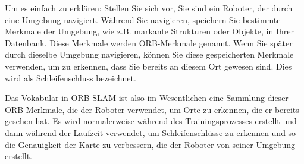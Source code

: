 Um es einfach zu erklären: Stellen Sie sich vor, Sie sind ein Roboter, der durch eine Umgebung navigiert. Während Sie navigieren, speichern Sie bestimmte Merkmale der Umgebung, wie z.B. markante Strukturen oder Objekte, in Ihrer Datenbank. Diese Merkmale werden ORB-Merkmale genannt. Wenn Sie später durch dieselbe Umgebung navigieren, können Sie diese gespeicherten Merkmale verwenden, um zu erkennen, dass Sie bereits an diesem Ort gewesen sind. Dies wird als Schleifenschluss bezeichnet.

Das Vokabular in ORB-SLAM ist also im Wesentlichen eine Sammlung dieser ORB-Merkmale, die der Roboter verwendet, um Orte zu erkennen, die er bereits gesehen hat. Es wird normalerweise während des Trainingsprozesses erstellt und dann während der Laufzeit verwendet, um Schleifenschlüsse zu erkennen und so die Genauigkeit der Karte zu verbessern, die der Roboter von seiner Umgebung erstellt.
\cite{ORBSLAM3TRO}

